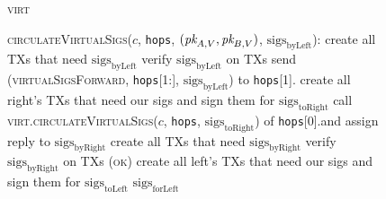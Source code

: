 \begin{figure}[H]
  \begin{processbox}{\textsc{virt}}
    \begin{algorithmic}[1]
      \State \textsc{circulateVirtualSigs}($c$, \texttt{hops}, $(\textit{pk}_{A,
      V}, \textit{pk}_{B, V})$, $\mathrm{sigs}_{\mathrm{byLeft}}$):
      \Indent
         
          \State create all TXs that need $\mathrm{sigs}_{\mathrm{byLeft}}$
          \TODO{}
          \State verify $\mathrm{sigs}_{\mathrm{byLeft}}$ on TXs \TODO{}
           
            \State send (\textsc{virtualSigsForward}, \texttt{hops}[1:],
            $\mathrm{sigs}_{\mathrm{byLeft}}$) to \texttt{hops}[1].\alice{}
            \State {} \TODO{}
            \State {}
            \State {} \TODO{}
            \State {}
            \TODO{}
            \State {} 
          \EndIf
        \Else \: 
          \State create all right's TXs that need our sigs and sign them for
          $\mathrm{sigs}_{\mathrm{toRight}}$ \TODO{}
          \State call \textsc{virt.circulateVirtualSigs}($c$, \texttt{hops},
          $\mathrm{sigs}_{\mathrm{toRight}}$) of \texttt{hops}[0].\bob and
          assign reply to $\mathrm{sigs}_{\mathrm{byRight}}$
          \State create all TXs that need $\mathrm{sigs}_{\mathrm{byRight}}$
          \TODO{}
          \State verify $\mathrm{sigs}_{\mathrm{byRight}}$ on TXs \TODO{}
          \State \Return (\textsc{ok})
        \EndIf
          \State create all left's TXs that need our sigs and sign
          them for $\mathrm{sigs}_{\mathrm{toLeft}}$ \TODO{}
          \State \Return $\mathrm{sigs}_{\mathrm{forLeft}}$
        \EndIf
      \EndIndent
      \Statex


\end{algorithmic}
\end{processbox}
\end{figure}
